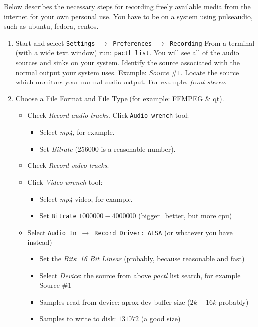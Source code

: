 Below describes the necessary steps for recording freely available media from the internet for your own personal use.  You have to be on a system using pulseaudio, such as ubuntu, fedora, centos.

\begin{enumerate}
    \item Start \CGG{} and select \texttt{Settings $\rightarrow$ Preferences $\rightarrow$  Recording} From a terminal (with a wide text window) run: \texttt{pactl list}. You will see all of the audio sources and sinks on your system. Identify the source associated with the normal output your system uses. Example: \textit{Source $\#1$}. Locate the source which monitors your normal audio output.  For example: \textit{front stereo}.        
    \item Choose a File Format and File Type (for example: FFMPEG \& qt).
    \begin{itemize}
        \item Check \textit{Record audio tracks}.
        Click \texttt{Audio wrench} tool:
        \begin{itemize}
            \item Select \textit{mp4}, for example.
            \item Set \textit{Bitrate} ($256000$ is a reasonable number).
        \end{itemize}
        \item Check \textit{Record video tracks}.
        \item Click \textit{Video wrench} tool:
        \begin{itemize}
            \item Select \textit{mp4} video, for example.
            \item Set \texttt{Bitrate} $1000000 - 4000000$ (bigger=better, but more cpu)
        \end{itemize}
        \item Select \texttt{Audio In $\rightarrow$ Record Driver:  ALSA} (or whatever you have instead)
        \begin{itemize}
            \item Set the \textit{Bits}: \textit{16 Bit Linear} (probably, because reasonable and fast)
            \item Select \textit{Device}: the source from above \textit{pactl} list search, for example Source $\#1$
            \item Samples read from device: aprox dev buffer size ($2k-16k$ probably)
            \item Samples to write to disk: $131072$ (a good size)

\end{itemize}
\end{itemize}
\end{enumerate}
